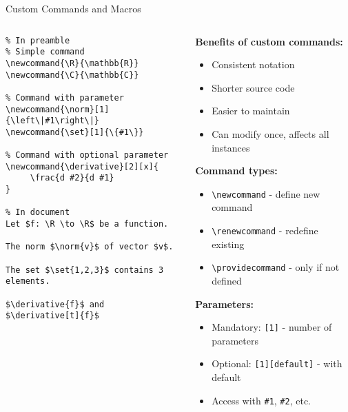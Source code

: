 \begin{frame}[fragile]{Custom Commands and Macros}
     \begin{columns}
          \begin{column}{0.5\textwidth}
               \begin{lstlisting}
% In preamble
% Simple command
\newcommand{\R}{\mathbb{R}}
\newcommand{\C}{\mathbb{C}}

% Command with parameter
\newcommand{\norm}[1]{\left\|#1\right\|}
\newcommand{\set}[1]{\{#1\}}

% Command with optional parameter
\newcommand{\derivative}[2][x]{
     \frac{d #2}{d #1}
}

% In document
Let $f: \R \to \R$ be a function.

The norm $\norm{v}$ of vector $v$.

The set $\set{1,2,3}$ contains 3 elements.

$\derivative{f}$ and $\derivative[t]{f}$
               \end{lstlisting}
          \end{column}
          
          \begin{column}{0.5\textwidth}
               \textbf{Benefits of custom commands:}
               \begin{itemize}
                    \item Consistent notation
                    \item Shorter source code
                    \item Easier to maintain
                    \item Can modify once, affects all instances
               \end{itemize}
               
               \textbf{Command types:}
               \begin{itemize}
                    \item \texttt{\textbackslash newcommand} - define new command
                    \item \texttt{\textbackslash renewcommand} - redefine existing
                    \item \texttt{\textbackslash providecommand} - only if not defined
               \end{itemize}
               
               \textbf{Parameters:}
               \begin{itemize}
                    \item Mandatory: \texttt{[1]} - number of parameters
                    \item Optional: \texttt{[1][default]} - with default
                    \item Access with \texttt{\#1}, \texttt{\#2}, etc.
               \end{itemize}
          \end{column}
     \end{columns}
     

\end{frame}
